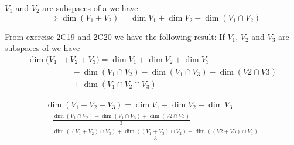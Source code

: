 \begin{thm} $V_1$ and $V_2$ are subspaces of a \fdvs we have
  \begin{equation}
    \implies \dim (V_1 + V_2) = \dim V_1 + \dim V_2 - \dim (V_1 \cap V_2)
  \end{equation}

  From exercise 2C19 and 2C20 we have the following result:
  If $V_1$, $V_2$ and $V_3$ are subspaces of \fdvs we have
  \begin{equation}
    \begin{aligned}
      \dim (V_1 &+ V_2 + V_3) = \dim V_1 + \dim V_2 + \dim V_3 \\
      & \quad - \dim (V_1 \cap V_2) - \dim (V_1 \cap V_3) - \dim (V2 \cap V3) \\
      & \quad + \dim (V_1 \cap V_2 \cap V_3)
    \end{aligned}
  \end{equation}

  \begin{equation}
    \begin{aligned}
      \dim (V_1 + V_2 + V_3)  = \dim V_1 + \dim V_2 + \dim V_3 \\
       - \frac{\dim (V_1 \cap V_2) + \dim (V_1 \cap V_3) + \dim (V2 \cap V3)}{3} \\
       - \frac{ \dim \left(  (V_1 + V_2) \cap V_3 \right) + \dim \left( (V_1 + V_3) \cap V_2 \right)+ \dim \left( (V2 + V3) \cap V_1 \right) }{3} \\
    \end{aligned}
  \end{equation}
\end{thm}


